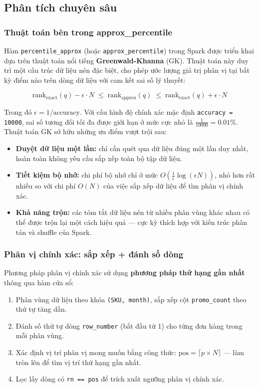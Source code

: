 \subsection{Phân tích chuyên sâu}

\subsubsection{Thuật toán bên trong approx\_percentile}

Hàm \texttt{percentile\_approx} (hoặc \texttt{approx\_percentile}) trong Spark được triển khai dựa trên thuật toán nổi tiếng \textbf{Greenwald-Khanna} (GK). Thuật toán này duy trì một cấu trúc dữ liệu nén đặc biệt, cho phép ước lượng giá trị phân vị tại bất kỳ điểm nào trên dòng dữ liệu với cam kết sai số lý thuyết:

\[
\text{rank}_{\text{exact}}(q) - \epsilon \cdot N \;\leq\; \text{rank}_{\text{approx}}(q) \;\leq\; \text{rank}_{\text{exact}}(q) + \epsilon \cdot N
\]

Trong đó $\epsilon = 1/\text{accuracy}$. Với cấu hình độ chính xác mặc định \texttt{accuracy = 10000}, sai số tương đối tối đa được giới hạn ở mức cực nhỏ là $\frac{1}{10000} = 0.01\%$. Thuật toán GK sở hữu những ưu điểm vượt trội sau:
\begin{itemize}
    \item \textbf{Duyệt dữ liệu một lần:} chỉ cần quét qua dữ liệu đúng một lần duy nhất, hoàn toàn không yêu cầu sắp xếp toàn bộ tập dữ liệu.
    \item \textbf{Tiết kiệm bộ nhớ:} chi phí bộ nhớ chỉ ở mức $O(\frac{1}{\epsilon} \log(\epsilon N))$, nhỏ hơn rất nhiều so với chi phí $O(N)$ của việc sắp xếp dữ liệu để tìm phân vị chính xác.
    \item \textbf{Khả năng trộn:} các tóm tắt dữ liệu nén từ nhiều phân vùng khác nhau có thể được trộn lại một cách hiệu quả --- cực kỳ thích hợp với kiến trúc phân tán và shuffle của Spark.
\end{itemize}

\subsubsection{Phân vị chính xác: sắp xếp + đánh số dòng}

Phương pháp phân vị chính xác sử dụng \textbf{phương pháp thứ hạng gần nhất} thông qua hàm cửa sổ:
\begin{enumerate}
    \item Phân vùng dữ liệu theo khóa \texttt{(SKU, month)}, sắp xếp cột \texttt{promo\_count} theo thứ tự tăng dần.
    \item Đánh số thứ tự dòng \texttt{row\_number} (bắt đầu từ 1) cho từng đơn hàng trong mỗi phân vùng.
    \item Xác định vị trí phân vị mong muốn bằng công thức: $\text{pos} = \lceil p \times N \rceil$ --- làm tròn lên để tìm vị trí thứ hạng gần nhất.
    \item Lọc lấy dòng có \texttt{rn == pos} để trích xuất ngưỡng phân vị chính xác.
\end{enumerate}

